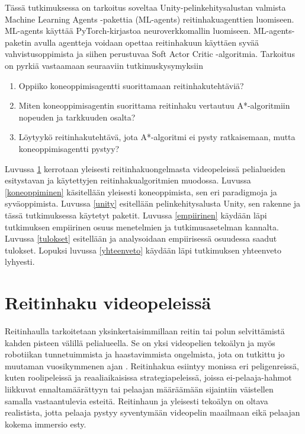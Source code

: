 \documentclass[utf8]{gradu3}
\begin{document}
Tässä tutkimuksessa on tarkoitus soveltaa Unity-pelinkehitysalustan valmista Machine Learning Agents -pakettia (ML-agents) reitinhakuagenttien luomiseen. ML-agents käyttää Py\-Torch-kirjastoa neuroverkkomallin luomiseen. ML-agents-paketin avulla agentteja voidaan opettaa reitinhakuun käyttäen syvää vahvistusoppimista ja siihen perustuvaa Soft Actor Critic -algoritmia. Tarkoitus on pyrkiä vastaamaan seuraaviin tutkimuskysymyksiin

\begin{enumerate}
\item Oppiiko koneoppimisagentti suorittamaan reitinhakutehtäviä?
\item Miten koneoppimisagentin suorittama reitinhaku vertautuu A*-algoritmiin nopeuden ja tarkkuuden osalta?
\item Löytyykö reitinhakutehtävä, jota A*-algoritmi ei pysty ratkaisemaan, mutta koneoppimisagentti pystyy?
\end{enumerate}

Luvussa \ref{reitinhakupeleis} kerrotaan yleisesti reitinhakuongelmasta videopeleissä pelialueiden esitystavan ja käytettyjen reitinhakualgoritmien muodossa. Luvussa \ref{koneoppiminen} käsitellään yleisesti koneoppimista, sen eri paradigmoja ja syväoppimista. Luvussa \ref{unity} esitellään pelinkehitysalusta Unity, sen rakenne ja tässä tutkimuksessa käytetyt paketit. Luvussa \ref{empiirinen} käydään läpi tutkimuksen empiirinen osuus menetelmien ja tutkimusasetelman kannalta. Luvussa \ref{tulokset} esitellään ja analysoidaan empiirisessä osuudessa saadut tulokset. Lopuksi luvussa \ref{yhteenveto} käydään läpi tutkimuksen yhteenveto lyhyesti.

\chapter{Reitinhaku videopeleissä}
\label{reitinhakupeleis}

Reitinhaulla tarkoitetaan yksinkertaisimmillaan reitin tai polun selvittämistä kahden pisteen välillä pelialueella. Se on yksi videopelien tekoälyn ja myös robotiikan tunnetuimmista ja haastavimmista ongelmista, jota on tutkittu jo muutaman vuosikymmenen ajan \parencite{abd2015comprehensive,cui2011based}. Reitinhakua esiintyy monissa eri peligenreissä, kuten roolipeleissä ja reaaliaikaisissa strategiapeleissä, joissa ei-pelaaja-hahmot liikkuvat ennaltamäärättyyn tai pelaajan määräämään sijaintiin väistellen samalla vastaantulevia esteitä. Reitinhaun ja yleisesti tekoälyn on oltava realistista, jotta pelaaja pystyy syventymään videopelin maailmaan eikä pelaajan kokema immersio esty.
\end{document}
